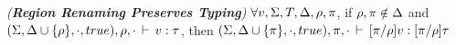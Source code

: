 \begin{lemma}
\emph{(\textbf{Region Renaming Preserves Typing})}
\label{thm:fb-renaming}
$\forall v, \Sigma, T, \Delta, \rho, \pi$, if $\rho,\pi \notin
\Delta$ and $(\Sigma,\Delta \cup \{\rho\},\cdot,true),
\rho, \cdot\,\vdash\,v:\tau$, then $(\Sigma,\Delta \cup \{\pi\}, 
\cdot,true),\pi, \cdot\,\vdash\,[\pi/\rho]v:[\pi/\rho]\tau$
\end{lemma}
